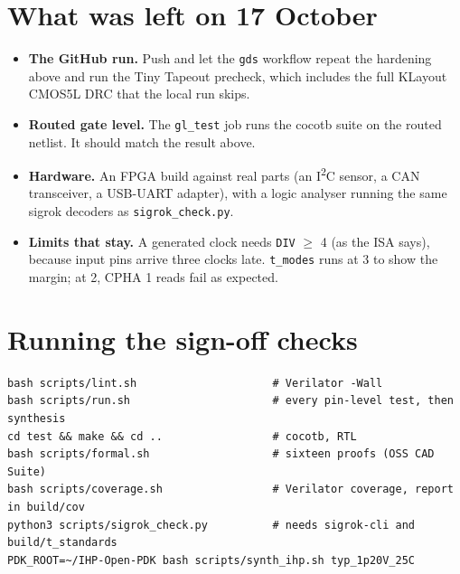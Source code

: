 \documentclass[11pt,a4paper]{article}
\newcommand{\sig}[1]{\texttt{#1}}
\begin{document}
\section{What was left on 17 October}

\begin{itemize}
\item \textbf{The GitHub run.} Push and let the \sig{gds} workflow repeat the hardening above and run the Tiny Tapeout precheck, which includes the full KLayout CMOS5L DRC that the local run skips.
\item \textbf{Routed gate level.} The \sig{gl\_test} job runs the cocotb suite on the routed netlist. It should match the result above.
\item \textbf{Hardware.} An FPGA build against real parts (an I\textsuperscript{2}C sensor, a CAN transceiver, a USB-UART adapter), with a logic analyser running the same sigrok decoders as \sig{sigrok\_check.py}.
\item \textbf{Limits that stay.} A generated clock needs \sig{DIV} $\ge$ 4 (as the ISA says), because input pins arrive three clocks late. \sig{t\_modes} runs at 3 to show the margin; at 2, CPHA 1 reads fail as expected.
\end{itemize}

\section{Running the sign-off checks}

\begin{lstlisting}
bash scripts/lint.sh                     # Verilator -Wall
bash scripts/run.sh                      # every pin-level test, then synthesis
cd test && make && cd ..                 # cocotb, RTL
bash scripts/formal.sh                   # sixteen proofs (OSS CAD Suite)
bash scripts/coverage.sh                 # Verilator coverage, report in build/cov
python3 scripts/sigrok_check.py          # needs sigrok-cli and build/t_standards
PDK_ROOT=~/IHP-Open-PDK bash scripts/synth_ihp.sh typ_1p20V_25C
\end{lstlisting}
\end{document}
